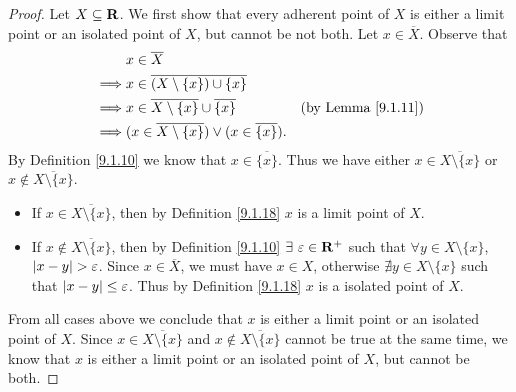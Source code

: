 \begin{proof}
    Let \(X \subseteq \mathbf{R}\).
    We first show that every adherent point of \(X\) is either a limit point or an isolated point of \(X\), but cannot be not both.
    Let \(x \in \overline{X}\).
    Observe that
    \begin{align*}
                 & x \in \overline{X}                                                                                   \\
        \implies & x \in \overline{(X \setminus \{x\}) \cup \{x\}}                                                      \\
        \implies & x \in \overline{X \setminus \{x\}} \cup \overline{\{x\}}            & \text{(by Lemma \ref{9.1.11})} \\
        \implies & (x \in \overline{X \setminus \{x\}}) \lor (x \in \overline{\{x\}}).
    \end{align*}
    By Definition \ref{9.1.10} we know that \(x \in \overline{\{x\}}\).
    Thus we have either \(x \in \overline{X \setminus \{x\}}\) or \(x \notin \overline{X \setminus \{x\}}\).
    \begin{itemize}
        \item If \(x \in \overline{X \setminus \{x\}}\), then by Definition \ref{9.1.18} \(x\) is a limit point of \(X\).
        \item If \(x \notin \overline{X \setminus \{x\}}\), then by Definition \ref{9.1.10} \(\exists\ \varepsilon \in \R^+\) such that \(\forall y \in X \setminus \{x\}\), \(\left\lvert x - y\right\rvert > \varepsilon\).
              Since \(x \in \overline{X}\), we must have \(x \in X\), otherwise \(\nexists y \in X \setminus \{x\}\) such that \(\left\lvert x - y\right\rvert \leq \varepsilon\).
              Thus by Definition \ref{9.1.18} \(x\) is a isolated point of \(X\).
    \end{itemize}
    From all cases above we conclude that \(x\) is either a limit point or an isolated point of \(X\).
    Since \(x \in \overline{X \setminus \{x\}}\) and \(x \notin \overline{X \setminus \{x\}}\) cannot be true at the same time, we know that \(x\) is either a limit point or an isolated point of \(X\), but cannot be both.


\end{proof}
